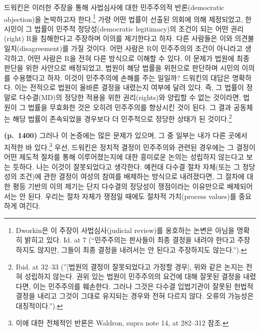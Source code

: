 \documentclass[a4paper,12pt,oneside]{article}  %
\begin{document}
드워킨은 이러한 주장을 통해 사법심사에 대한 민주주의적 반론(democratic
objection)을 논박하고자 한다.\footnote{Dworkin은 이 주장이
  사법심사(judicial review)를 옹호하는 논변은 아님을 명확히 밝히고 있다.
  Id. at 7 (``민주주의는 판사들이 최종 결정을 내려야 한다고 주장하지도
  않지만, 그들이 최종 결정을 내려서는 안 된다고 주장하지도 않는다.'').}
가령 어떤 법률이 선출된 의회에 의해 제정되었고, 한 시민이 그 법률이
민주적 정당성(democratic legitimacy)의 조건이 되는 어떤 권리(right) R을
침해한다고 주장하며 이의를 제기한다고 하자. 다른 사람들은 이와
의견불일치(disagreement)를 가질 것이다. 어떤 사람은 R이 민주주의의
조건이 아니라고 생각하고, 어떤 사람은 R을 전혀 다른 방식으로 이해할 수
있다. 이 문제가 법원에 최종 판단을 위한 사안으로 배정되었고, 법원이 해당
법률을 위헌으로 판단하며 시민의 이의를 수용했다고 하자. 이것이
민주주의에 손해를 주는 일일까? 드워킨의 대답은 명확하다. 이는 전적으로
법원이 올바른 결정을 내렸는지 여부에 달려 있다. 즉, 그 법률이 정말로
다수결(MD)의 정당한 적용을 위한 권리(rights)와 양립할 수 없는 것이라면,
법원이 그 법률을 무효화한 것은 오히려 민주주의를 향상시킨 것이 된다. 그
결과 공동체는 해당 법률이 존속되었을 경우보다 더 민주적으로 정당한
상태가 된 것이다.\footnote{Ibid. at 32--33 (''{[}법원의 결정이
  잘못되었다고 가정할 경우{]}, 위와 같은 논지는 전혀 성립하지 않는다.
  권위 있는 법원이 민주주의의 요건에 대해 잘못된 결정을 내렸다면, 이는
  민주주의를 훼손한다. 그러나 그것은 다수결 입법기관이 잘못된 헌법적
  결정을 내리고 그것이 그대로 유지되는 경우와 전혀 다르지 않다. 오류의
  가능성은 대칭적이다.'').}

\textbf{(p.~1400)} 그러나 이 논증에는 많은 문제가 있으며, 그 중 일부는
내가 다른 곳에서 지적한 바 있다.\footnote{이에 대한 전체적인 반론은
  Waldron, supra note 14, at 282--312 참조.} 우선, 드워킨은 정치적
결정이 민주주의와 관련된 경우에는 그 결정이 어떤 제도적 절차를 통해
이루어졌는지에 대한 흥미로운 논의는 성립하지 않는다고 보는 듯하다. 나는
이것이 잘못되었다고 생각한다. 예컨대 다수결 절차 자체(또는 그 정당성의
조건)에 관한 결정이 여성의 참여를 배제하는 방식으로 내려졌다면, 그
절차에 대한 평등 기반의 이의 제기는 단지 다수결의 정당성이 쟁점이라는
이유만으로 배제되어서는 안 된다. 우리는 절차 자체가 쟁점일 때에도 절차적
가치(process values)를 중요하게 여긴다.
\end{document}
